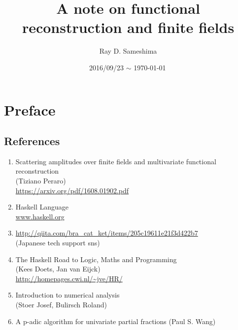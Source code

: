 \documentclass[11pt]{book}
\begin{document}
\lstset{ language = Haskell
         , numbers = left
         , breaklines = true
         , basicstyle = \small\ttfamily
         }

\newcommand{\Slash}[1]{{\ooalign{\hfil/\crcr$#1$}}}

\title{A note on functional reconstruction and finite fields}
\author{Ray D. Sameshima}
\date{2016/09/23 $\sim$ \today \, \currenttime}
\maketitle

\tableofcontents


\setcounter{chapter}{-1}
\chapter{Preface}
\section{References}
\begin{enumerate}
\item \label{Tiziano}
Scattering amplitudes over finite fields and multivariate functional reconstruction\\
(Tiziano Peraro)\\
\url{https://arxiv.org/pdf/1608.01902.pdf}

\item Haskell Language \\
\url{www.haskell.org}

\item \url{http://qiita.com/bra_cat_ket/items/205c19611e21f3d422b7}\\
 (Japanese tech support sns)

\item \label{Haskellroad}
The Haskell Road to Logic, Maths and Programming\\ 
(Kees Doets, Jan van Eijck)\\
\url{http://homepages.cwi.nl/~jve/HR/}

\item \label{Numerical}
Introduction to numerical analysis\\ 
(Stoer Josef, Bulirsch Roland)

\item \label{p-adic}
A p-adic algorithm for univariate partial fractions
(Paul S. Wang)

\end{enumerate}
\end{document}

